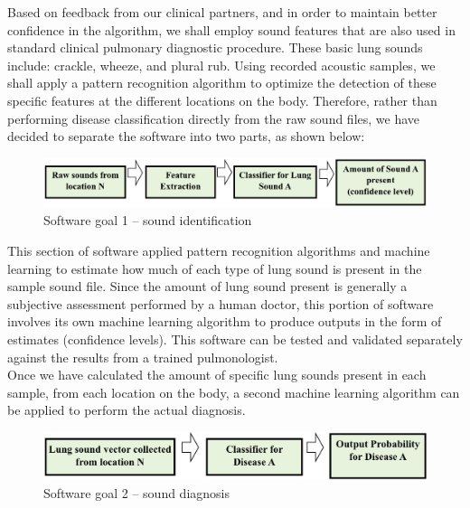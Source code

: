 \documentclass{article}
\begin{document}
 Based on feedback from our clinical partners, and in order to maintain better confidence in the algorithm, we shall employ sound features that are also used in standard clinical pulmonary diagnostic procedure. These basic lung sounds include: crackle, wheeze, and plural rub. Using recorded acoustic samples, we shall apply a pattern recognition algorithm to optimize the detection of these specific features at the different locations on the body. Therefore, rather than performing disease classification directly from the raw sound files, we have decided to separate the software into two parts, as shown below: \\
 
 \begin{figure}[H]
 \minipage{\textwidth}
 	\includegraphics[width=\linewidth]{images/SoftwareGoal1.png}
 	\caption{Software goal 1 -- sound identification}
 \endminipage\hfill
 \end{figure}
 
 This section of software applied pattern recognition algorithms and machine learning to estimate how much of each type of lung sound is present in the sample sound file.  Since the amount of lung sound present is generally a subjective assessment performed by a human doctor, this portion of software involves its own machine learning algorithm to produce outputs in the form of estimates (confidence levels).  This software can be tested and validated separately against the results from a trained pulmonologist.\\
 
 Once we have calculated the amount of specific lung sounds present in each sample, from each location on the body, a second machine learning algorithm can be applied to perform the actual diagnosis.\\
 
  \begin{figure}[H]
  \minipage{\textwidth}
  	\includegraphics[width=\linewidth]{images/SoftwareGoal2.png}
  	\caption{Software goal 2 -- sound diagnosis}
  \endminipage\hfill
  \end{figure}
\end{document}
